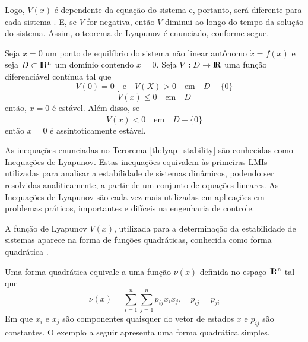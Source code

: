 Logo, $\dot{V}(x)$ é dependente da equação do sistema e, portanto, será diferente para cada sistema \cite{bookkhalil:2003}. E, se $\dot{V}$ for negativa, então $V$ diminui ao longo do tempo da solução do sistema. Assim, o teorema de Lyapunov é enunciado, conforme segue.

\begin{theorem}\label{th:lyap_stability}
 Seja $x = 0$ um ponto de equilíbrio do sistema não linear autônomo $\dot{x} = f(x)$ e seja $D \subset \rm I\!R^{n}$ um domínio contendo $x = 0$. Seja $V: D \rightarrow \rm I\!R$ uma função diferenciável contínua tal que
\begin{equation}\label{eq:def_V}
V(0) = 0\quad\text{e}\quad V(X) > 0\quad\text{em}\quad D - \{0\}
\end{equation}
\begin{equation}\label{eq:def_dot_V_stable}
\dot{V}(x) \leq 0\quad\text{em}\quad D
\end{equation}
então, $x = 0$ é estável. Além disso, se
\begin{equation}\label{eq:def_dot_V_assymp_stable}
\dot{V}(x) < 0\quad\text{em}\quad D - \{0\}
\end{equation}
então $x = 0$ é assintoticamente estável.
\end{theorem}

As inequações enunciadas no Terorema \ref{th:lyap_stability} são conhecidas como Inequações de Lyapunov. Estas inequações equivalem \`{a}s primeiras LMIs utilizadas para analisar a estabilidade de sistemas dinâmicos, podendo ser resolvidas analiticamente, a partir de um conjunto de equações lineares. As Inequações de Lyapunov são cada vez mais utilizadas  em aplicações em problemas práticos, importantes e difíceis na engenharia de controle.

A função de Lyapunov $V(x)$, utilizada para a determinação da estabilidade de sistemas aparece na forma de funções quadráticas, conhecida como forma quadrática \cite{bookboydl:1994}.

Uma forma quadrática equivale a uma função $\nu(x)$ definida no espaço $\rm I\!R^{n}$ tal que
\begin{equation}\label{eq:forma_quadr}
\nu(x) = \sum_{i = 1}^{n}\sum_{j = 1}^{n}p_{ij}x_ix_j,\quad p_{ij} = p_{ji}
\end{equation}
Em que $x_i$ e $x_j$ são componentes quaisquer do vetor de estados $x$ e $p_{ij}$ são constantes. O exemplo a seguir apresenta uma forma quadrática simples.


